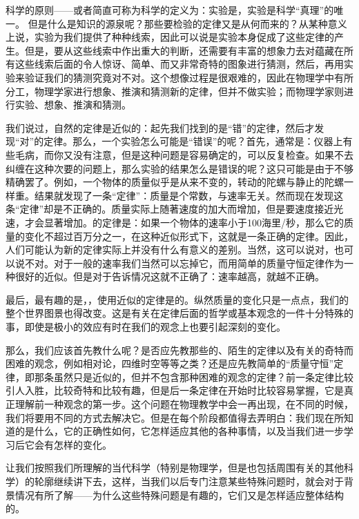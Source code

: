 \documentclass[12pt,oneside]{book}
\begin{document}
科学的原则——或者简直可称为科学的定义为：实验是，实验是科学“真理”的唯一。 但是什么是知识的源泉呢？那些要检验的定律又是从何而来的？从某种意义上说，实验为我们提供了种种线索，因此可以说是实验本身促成了这些定律的产生。但是，要从这些线索中作出重大的判断，还需要有丰富的想象力去对蕴藏在所有这些线索后面的令人惊讶、简单、而又非常奇特的图象进行猜测，然后，再用实验来验证我们的猜测究竟对不对。这个想像过程是很艰难的，因此在物理学中有所分工，物理学家进行想象、推演和猜测新的定律，但并不做实验；而物理学家则进行实验、想象、推演和猜测。

我们说过，自然的定律是近似的：起先我们找到的是“错”的定律，然后才发现“对”的定律。那么，一个实验怎么可能是“错误”的呢？首先，通常是：仪器上有些毛病，而你又没有注意，但是这种问题是容易确定的，可以反复检查。如果不去纠缠在这种次要的问题上，那么实验的结果怎么是错误的呢？这只可能是由于不够精确罢了。例如，一个物体的质量似乎是从来不变的，转动的陀螺与静止的陀螺一样重。结果就发现了一条“定律”：质量是个常数，与速率无关。然而现在发现这条“定律”却是不正确的。质量实际上随著速度的加大而增加，但是要速度接近光速，才会显著增加。的定律是：如果一个物体的速率小于100海里/秒，那么它的质量的变化不超过百万分之一，在这种近似形式下，这就是一条正确的定律。因此，人们可能认为新的定律实际上并没有什么有意义的差别。当然，这可以说对，也可以说不对。对于一般的速率我们当然可以忘掉它，而用简单的质量守恒定律作为一种很好的近似。但是对于告诉情况这就不正确了：速率越高，就越不正确。

最后，最有趣的是，，使用近似的定律是的。纵然质量的变化只是一点点，我们的整个世界图景也得改变。这是有关在定律后面的哲学或基本观念的一件十分特殊的事，即使是极小的效应有时在我们的观念上也要引起深刻的变化。

那么，我们应该首先教什么呢？是否应先教那些的、陌生的定律以及有关的奇特而困难的观念，例如相对论，四维时空等等之类？还是应先教简单的“质量守恒”定律，即那条虽然只是近似的，但并不包含那种困难的观念的定律？前一条定律比较引人入胜，比较奇特和比较有趣，但是后一条定律在开始时比较容易掌握，它是真正理解前一种观念的第一步。这个问题在物理教学中会一再出现，在不同的时候，我们将要用不同的方式去解决它。但是在每个阶段都值得去弄明白：我们现在所知道的是什么，它的正确性如何，它怎样适应其他的各种事情，以及当我们进一步学习后它会有怎样的变化。

让我们按照我们所理解的当代科学（特别是物理学，但是也包括周围有关的其他科学）的轮廓继续讲下去，这样，当我们以后专门注意某些特殊问题时，就会对于背景情况有所了解——为什么这些特殊问题是有趣的，它们又是怎样适应整体结构的。
\end{document}
